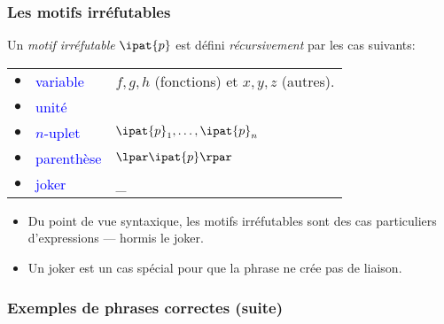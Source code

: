 %
\begin{frame}
\frametitle{Les motifs irréfutables}

Un \emph{motif irréfutable} $\ipat{p}$ est défini \emph{récursivement}
par les cas suivants:

\begin{tabular}{rll}
    $\bullet$
  & \textcolor{blue}{variable}
  & $f, g, h$ (fonctions) et $x, y, z$ (autres). \\
    $\bullet$
  & \textcolor{blue}{unité}
  & \unit\\
    $\bullet$
  & \textcolor{blue}{$n$-uplet}
  & $\ipat{p}_1, \ldots, \ipat{p}_n$\\
    $\bullet$
  & \textcolor{blue}{parenthèse}
  & $\lpar\ipat{p}\rpar$\\
    $\bullet$
  & \textcolor{blue}{joker}
  & {\Large \_}
\end{tabular}

\bigskip

\remarques

\begin{itemize}


  \item Du point de vue syntaxique, les motifs irréfutables sont des
  cas particuliers d'expressions --- hormis le joker.

   \item Un joker est un cas spécial pour que la phrase ne crée pas
   de liaison.

\end{itemize}

\end{frame}

%
\begin{frame}
\frametitle{Exemples de phrases correctes (suite)}









\end{frame}

